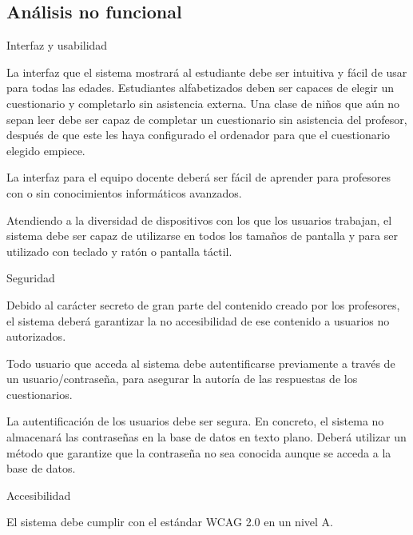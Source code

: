 \subsection{Análisis no funcional}

\begin{rnf0}
	\item Interfaz y usabilidad
		\begin{rnf0*}
			\item La interfaz que el sistema mostrará al estudiante debe ser intuitiva y fácil de usar para todas las edades. Estudiantes alfabetizados deben ser capaces de elegir un cuestionario y completarlo sin asistencia externa. Una clase de niños que aún no sepan leer debe ser capaz de completar un cuestionario sin asistencia del profesor, después de que este les haya configurado el ordenador para que el cuestionario elegido empiece.
			\item La interfaz para el equipo docente deberá ser fácil de aprender para profesores con o sin conocimientos informáticos avanzados. 
			\item Atendiendo a la diversidad de dispositivos con los que los usuarios trabajan, el sistema debe ser capaz de utilizarse en todos los tamaños de pantalla y para ser utilizado con teclado y ratón o pantalla táctil.
		\end{rnf0*}
	\item Seguridad
		\begin{rnf0*}
			\item Debido al carácter secreto de gran parte del contenido creado por los profesores, el sistema deberá garantizar la no accesibilidad de ese contenido a usuarios no autorizados.
			\item Todo usuario que acceda al sistema debe autentificarse previamente a través de un usuario/contraseña, para asegurar la autoría de las respuestas de los cuestionarios.
			\item La autentificación de los usuarios debe ser segura. En concreto, el sistema no almacenará las contraseñas en la base de datos en texto plano. Deberá utilizar un método que garantize que la contraseña no sea conocida aunque se acceda a la base de datos.
		\end{rnf0*}
	\item Accesibilidad
		\begin{rnf0*}
			\item El sistema debe cumplir con el estándar \acrshort{WCAG} 2.0 en un nivel A.
		\end{rnf0*}
\end{rnf0}


